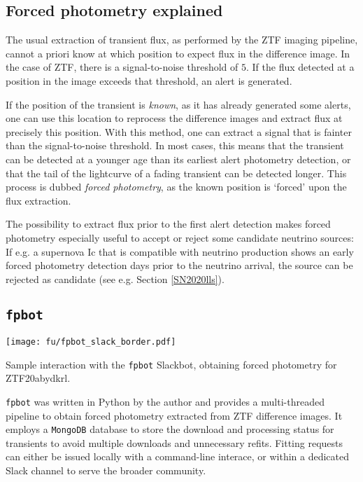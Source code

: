 \subsection{Forced photometry explained}
The usual extraction of transient flux, as performed by the ZTF imaging pipeline, cannot a priori know at which position to expect flux in the difference image. In the case of ZTF, there is a signal-to-noise threshold of $5$. If the flux detected at a position in the image exceeds that threshold, an alert is generated.

If the position of the transient is \textit{known}, as it has already generated some alerts, one can use this location to reprocess the difference images and extract flux at precisely this position. With this method, one can extract a signal that is fainter than the signal-to-noise threshold. In most cases, this means that the transient can be detected at a younger age than its earliest alert photometry detection, or that the tail of the lightcurve of a fading transient can be detected longer. This process is dubbed \textit{forced photometry}, as the known position is `forced' upon the flux extraction.

The possibility to extract flux prior to the first alert detection makes forced photometry especially useful to accept or reject some candidate neutrino sources: If e.g. a supernova Ic that is compatible with neutrino production shows an early forced photometry detection days prior to the neutrino arrival, the source can be rejected as candidate (see e.g. Section \ref{SN2020lls}).

\subsection{\texttt{fpbot}}
\begin{marginfigure}
    \texttt{[image: fu/fpbot\_slack\_border.pdf]}
    \caption[\texttt{fpbot} Slackbot interaction]{Sample interaction with the \texttt{fpbot} Slackbot, obtaining forced photometry for ZTF20abydkrl.}
\end{marginfigure} 
\texttt{fpbot} was written in Python by the author and provides a multi-threaded pipeline to obtain forced photometry extracted from ZTF difference images. It employs a \texttt{MongoDB} database to store the download and processing status for transients to avoid multiple downloads and unnecessary refits. Fitting requests can either be issued locally with a command-line interace, or within a dedicated Slack channel to serve the broader community.

